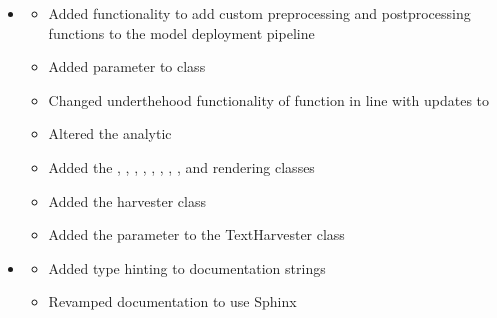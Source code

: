 \documentclass[letterpaper,10pt,english]{sphinxmanual}
\begin{document}
\begin{itemize}
\begin{description}
\begin{itemize}
\end{itemize}

\end{description}

\item {} \begin{description}
\begin{itemize}
\item {} 
\sphinxAtStartPar
Added functionality to add custom preprocessing and postprocessing functions to the model deployment pipeline

\item {} 
\sphinxAtStartPar
Added  parameter to  class

\item {} 
\sphinxAtStartPar
Changed under\sphinxhyphen{}the\sphinxhyphen{}hood functionality of  function in line with updates to 

\item {} 
\sphinxAtStartPar
Altered the  analytic

\item {} 
\sphinxAtStartPar
Added the , , , , , , , , and  rendering classes

\item {} 
\sphinxAtStartPar
Added the  harvester class

\item {} 
\sphinxAtStartPar
Added the  parameter to the TextHarvester class

\end{itemize}

\end{description}

\item {} \begin{description}
\begin{itemize}
\item {} 
\sphinxAtStartPar
Added type hinting to documentation strings

\item {} 
\sphinxAtStartPar
Revamped documentation to use Sphinx


\end{itemize}
\end{description}
\end{itemize}
\end{document}

